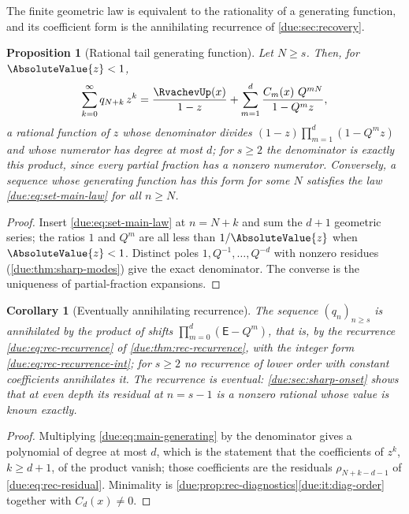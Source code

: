 \documentclass[11pt,oneside]{article}
\theoremstyle{plain}
\newtheorem{proposition}[theorem]{Proposition}
\newtheorem{corollary}[theorem]{Corollary}
\theoremstyle{definition}
\theoremstyle{remark}
\newcommand{\upn}[1]{\RvachevUp_{#1}}
\newcommand{\Qq}{Q}                                         %
\newcommand{\Cr}[2]{C_{#1}\!\left(#2\right)}                %
\newcommand{\qn}[1]{q_{#1}}                                 %
\begin{document}
The finite geometric law is equivalent to the rationality of a generating
function, and its coefficient form is the annihilating recurrence of
\cref{due:sec:recovery}.

\begin{proposition}[Rational tail generating function]
\label{due:prop:main-generating}
Let $N\ge s$.  Then, for $\AbsoluteValue{z}<1$,
\begin{equation}
 \sum_{k=0}^{\infty}\qn{N+k}\,z^{k}
 =\frac{\RvachevUp(x)}{1-z}
 +\sum_{m=1}^{d}\frac{\Cr{m}{x}\,\Qq^{mN}}{1-\Qq^{m}z},
 \label{due:eq:main-generating}
\end{equation}
a rational function of $z$ whose denominator divides
$(1-z)\prod_{m=1}^{d}(1-\Qq^{m}z)$ and whose numerator has degree at most
$d$; for $s\ge2$ the denominator is exactly this product, since every
partial fraction has a nonzero numerator.  Conversely, a sequence whose
generating function has this form for some $N$ satisfies the law
\cref{due:eq:set-main-law} for all $n\ge N$.
\end{proposition}

\begin{proof}
Insert \cref{due:eq:set-main-law} at $n=N+k$ and sum the $d+1$ geometric
series; the ratios $1$ and $\Qq^{m}$ are all less than $1/\AbsoluteValue{z}$
when $\AbsoluteValue{z}<1$.  Distinct poles $1,\Qq^{-1},\ldots,\Qq^{-d}$
with nonzero residues (\cref{due:thm:sharp-modes}) give the exact
denominator.  The converse is the uniqueness of partial-fraction
expansions.
\end{proof}

\begin{corollary}[Eventually annihilating recurrence]
\label{due:cor:main-recurrence}
The sequence $(\qn{n})_{n\ge s}$ is annihilated by the product of shifts
$\prod_{m=0}^{d}(\mathsf E-\Qq^{m})$, that is, by the recurrence
\cref{due:eq:rec-recurrence} of \cref{due:thm:rec-recurrence}, with the
integer form \cref{due:eq:rec-recurrence-int}; for $s\ge2$ no recurrence of
lower order with constant coefficients annihilates it.  The recurrence is
\emph{eventual}: \cref{due:sec:sharp-onset} shows that at even depth its
residual at $n=s-1$ is a nonzero rational whose value is known exactly.
\end{corollary}

\begin{proof}
Multiplying \cref{due:eq:main-generating} by the denominator gives a
polynomial of degree at most $d$, which is the statement that the
coefficients of $z^{k}$, $k\ge d+1$, of the product vanish; those
coefficients are the residuals $\rho_{N+k-d-1}$ of \cref{due:eq:rec-residual}.
Minimality is \cref{due:prop:rec-diagnostics}\ref{due:it:diag-order}
together with $\Cr{d}{x}\ne0$.
\end{proof}
\end{document}
